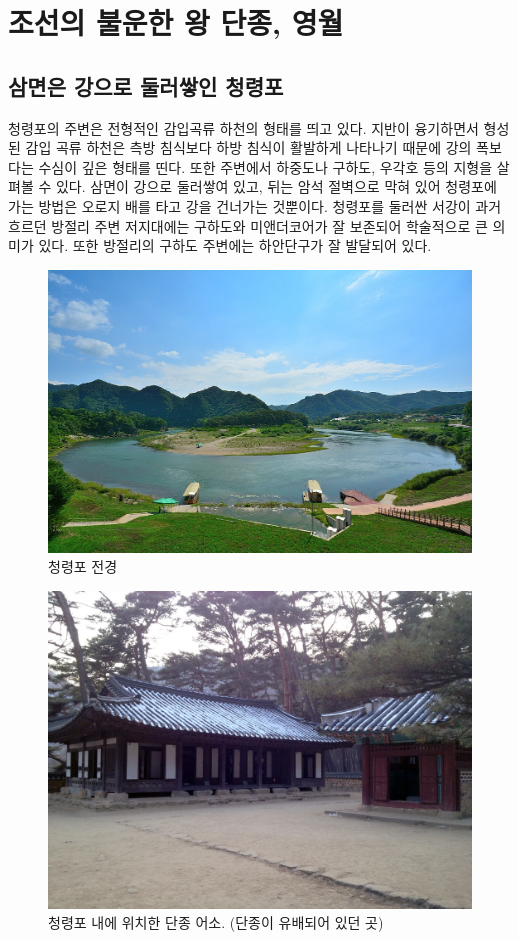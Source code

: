 \section{조선의 불운한 왕 단종, 영월}
\subsection{삼면은 강으로 둘러쌓인 청령포}
청령포의 주변은 전형적인 감입곡류 하천의 형태를 띄고 있다. 지반이 융기하면서 형성된 감입 곡류 하천은 측방 침식보다 하방 침식이 활발하게 나타나기 때문에 강의 폭보다는 수심이 깊은 형태를 띤다. 
또한 주변에서 하중도나 구하도, 우각호 등의 지형을 살펴볼 수 있다. 삼면이 강으로 둘러쌓여 있고, 
뒤는 암석 절벽으로 막혀 있어 청령포에 가는 방법은 오로지 배를 타고 강을 건너가는 것뿐이다. 
청령포를 둘러싼 서강이 과거 흐르던 방절리 주변 저지대에는 구하도와 미앤더코어가 잘 보존되어 학술적으로 큰 의미가 있다.
또한 방절리의 구하도 주변에는 하안단구가 잘 발달되어 있다. 


\begin{figure}
    \centering
    \includegraphics[width=.6\textwidth]{s_img/청령포_사진.jpeg}
    \caption{청령포 전경}
    \label{fig:my_label_s3}
 \end{figure}

 
\begin{figure}
    \centering
    \includegraphics[width=.6\textwidth]{s_img/청령포_사진_2.JPG}
    \caption{청령포 내에 위치한 단종 어소. (단종이 유배되어 있던 곳) \protect\footnotemark}
    \label{fig:my_label_s31}
 \end{figure}
 
